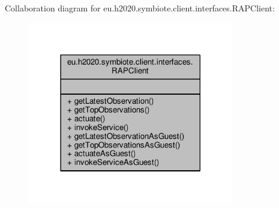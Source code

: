 Collaboration diagram for eu.\+h2020.\+symbiote.\+client.\+interfaces.\+R\+A\+P\+Client\+:\nopagebreak
\begin{figure}[H]
\begin{center}
\leavevmode
\includegraphics[width=254pt]{interfaceeu_1_1h2020_1_1symbiote_1_1client_1_1interfaces_1_1RAPClient__coll__graph}
\end{center}
\end{figure}
